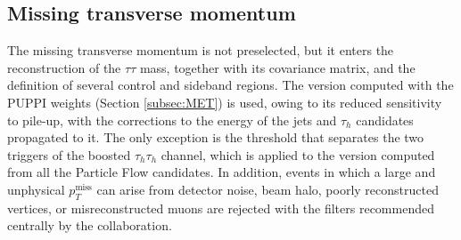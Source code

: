\subsection{Missing transverse momentum}
%
The missing transverse momentum is not preselected, but it enters the reconstruction of the $\tau\tau$ mass, together with its covariance matrix, and the definition of several control and sideband regions. The version computed with the PUPPI weights (Section \ref{subsec:MET}) is used, owing to its reduced sensitivity to pile-up, with the corrections to the energy of the jets and $\tau_h$ candidates propagated to it. The only exception is the threshold that separates the two triggers of the boosted $\tau_h\tau_h$ channel, which is applied to the version computed from all the Particle Flow candidates. In addition, events in which a large and unphysical $p_T^\text{miss}$ can arise from detector noise, beam halo, poorly reconstructed vertices, or misreconstructed muons are rejected with the filters recommended centrally by the collaboration.





